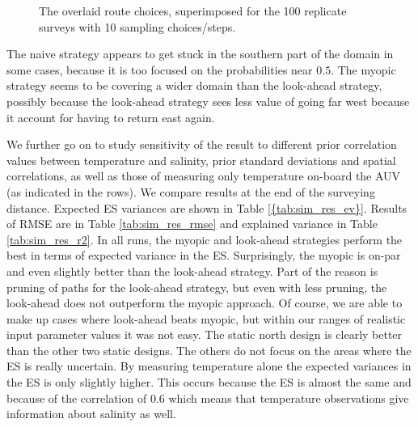 \documentclass[aoas]{imsart}
\begin{document}
\begin{figure}[!h]
  \hfill
\caption{The overlaid route choices, superimposed for the 100 replicate
  surveys with 10 sampling choices/steps.} 
\label{fig:route_choices}
\end{figure}

The naive strategy appears to get stuck in the southern part of the
domain in some cases, because it is too focused on the probabilities
near $0.5$. The myopic strategy seems to be covering a wider domain than
the look-ahead strategy, possibly because the look-ahead strategy sees
less value of going far west because it account for having to return
east again.

We further go on to study sensitivity of the result to different prior correlation values between temperature and salinity, prior standard deviations and spatial correlations, as well as those of measuring only temperature on-board the AUV (as indicated in the rows). We compare results at the end of the surveying distance. Expected ES variances are shown in Table \ref{{tab:sim_res_ev}}. Results of RMSE are in Table \ref{tab:sim_res_rmse} and explained variance in Table \ref{tab:sim_res_r2}. 
In all runs, the myopic and look-ahead strategies perform the best in terms of expected variance in the ES. Surprisingly, the myopic is on-par and even slightly better than the look-ahead strategy. Part of the reason is pruning of paths for the look-ahead strategy, but even with less pruning, the look-ahead does not outperform the myopic approach. Of course, we are able to make up cases where look-ahead beats myopic, but within our ranges of realistic input parameter values it was not easy.
The static north design is clearly better than the other two static designs. The others do not focus on the areas where the ES is really uncertain. 
By measuring temperature alone the expected variances in the ES is only slightly higher. This occurs because the ES is almost the same and because of the correlation of $0.6$ which means that temperature observations give information about salinity as well. 
\end{document}
